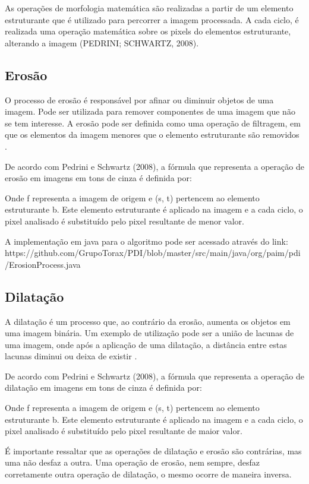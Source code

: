 \documentclass[
	12pt,				%
	oneside,			%
	a4paper,			%
	english,			%
	french,				%
	spanish,			%
	brazil,				%
	]{abntex2}
\begin{document}
As operações de morfologia matemática são realizadas a partir de um elemento estruturante que é utilizado para percorrer a imagem processada. A cada ciclo, é realizada uma operação matemática sobre os pixels do elementos estruturante, alterando a imagem (PEDRINI; SCHWARTZ, 2008).

\subsection{Erosão}
O processo de erosão é responsável por afinar ou diminuir objetos de uma imagem. Pode ser utilizada para remover componentes de uma imagem que não se tem interesse. A erosão pode ser definida como uma operação de filtragem, em que os elementos da imagem menores que o elemento estruturante são removidos \cite{gonzalesWoods:2008}.

De acordo com Pedrini e Schwartz (2008), a fórmula que representa a operação de erosão em imagens em tons de cinza é definida por:

Onde f representa a imagem de origem e (s, t) pertencem ao elemento estruturante b. Este elemento estruturante é aplicado na imagem e a cada ciclo, o pixel analisado é substituído pelo pixel resultante de menor valor.

A implementação em java para o algoritmo pode ser acessado através do link:
https://github.com/GrupoTorax/PDI/blob/master/src/main/java/org/paim/pdi/ErosionProcess.java 

\subsection{Dilatação}

A dilatação é um processo que, ao contrário da erosão, aumenta os objetos em uma imagem binária. Um exemplo de utilização pode ser a união de lacunas de uma imagem, onde após a aplicação de uma dilatação, a distância entre estas lacunas diminui ou deixa de existir \cite{gonzalesWoods:2008}. 

De acordo com Pedrini e Schwartz (2008), a fórmula que representa a operação de dilatação em imagens em tons de cinza é definida por:

Onde f representa a imagem de origem e (s, t) pertencem ao elemento estruturante b. Este elemento estruturante é aplicado na imagem e a cada ciclo, o pixel analisado é substituído pelo pixel resultante de maior valor.

É importante ressaltar que as operações de dilatação e erosão são contrárias, mas uma não desfaz a outra. Uma operação de erosão, nem sempre, desfaz corretamente outra operação de dilatação, o mesmo ocorre de maneira inversa.
\end{document}
